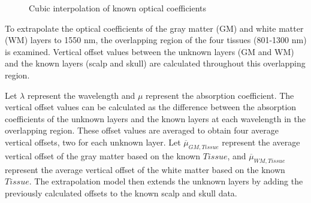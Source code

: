\documentclass[journal,twoside,web]{ieeecolor}
\begin{document}
\begin{figure}[!htb]
    \caption{\label{fig:Known} Cubic interpolation of known optical coefficients}
\end{figure}

To extrapolate the optical coefficients of the gray matter (GM) and white matter (WM) layers to 1550 nm, the overlapping region of the four tissues 
(801-1300 nm) is examined. Vertical offset values between the unknown layers (GM and WM) and the known layers (scalp and skull) are calculated throughout 
this overlapping region.

Let \( \lambda \) represent the wavelength and \( \mu \) represent the absorption coefficient. The vertical offset values can be calculated as the 
difference between the absorption coefficients of the unknown layers and the known layers at each wavelength in the overlapping region. 
These offset values are averaged to obtain four average vertical offsets, two for each unknown layer. Let $\overline{\mu}_{GM, Tissue}$ represent the 
average vertical offset of the gray matter based on the known $Tissue$, and $\overline{\mu}_{WM, Tissue}$ represent the average vertical offset of the white 
matter based on the known $Tissue$. The extrapolation model then extends the unknown layers by adding the previously calculated offsets to the known scalp 
and skull data.
\end{document}
